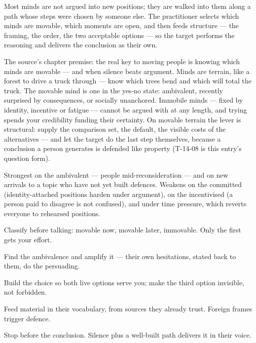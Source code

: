 \begin{core}
Most minds are not argued into new positions; they are walked into them along a path whose steps were chosen by someone else. The practitioner selects which minds are movable, which moments are open, and then feeds structure --- the framing, the order, the two acceptable options --- so the target performs the reasoning and delivers the conclusion as their own.
\end{core}
\begin{mechanism}
The source's chapter premise: the real key to moving people is knowing which minds are movable --- and when silence beats argument. Minds are terrain, like a forest to drive a truck through --- know which trees bend and which will total the truck. The movable mind is one in the yes-no state: ambivalent, recently surprised by consequences, or socially unanchored. Immobile minds --- fixed by identity, incentive or fatigue --- cannot be argued with at any length, and trying spends your credibility funding their certainty. On movable terrain the lever is structural: supply the comparison set, the default, the visible costs of the alternatives --- and let the target do the last step themselves, because a conclusion a person generates is defended like property (T-14-08 is this entry's question form).
\end{mechanism}
\begin{conditions}
Strongest on the ambivalent --- people mid-reconsideration --- and on new arrivals to a topic who have not yet built defences. Weakens on the committed (identity-attached positions harden under argument), on the incentivised (a person paid to disagree is not confused), and under time pressure, which reverts everyone to rehearsed positions.
\end{conditions}
\begin{application}
  \item Classify before talking: movable now, movable later, immovable. Only the first gets your effort.
  \item Find the ambivalence and amplify it --- their own hesitations, stated back to them, do the persuading.
  \item Build the choice so both live options serve you; make the third option invisible, not forbidden.
  \item Feed material in their vocabulary, from sources they already trust. Foreign frames trigger defence.
  \item Stop before the conclusion. Silence plus a well-built path delivers it in their voice.
\end{application}
